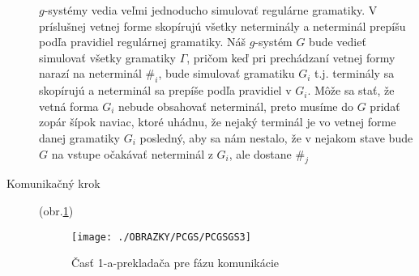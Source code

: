 \begin{dokaz}
\begin{description}
  $g$-systémy vedia veľmi jednoducho simulovať regulárne
  gramatiky. V príslušnej vetnej forme skopírujú všetky
  neterminály a neterminál prepíšu podľa pravidiel regulárnej
  gramatiky. Náš $g$-systém $G$ bude vedieť simulovať všetky gramatiky
  $\Gamma$, pričom keď pri prechádzaní vetnej formy narazí na
  neterminál $\#_i$, bude simulovať gramatiku $G_i$ t.j. terminály
  sa skopírujú a neterminál sa prepíše podľa pravidiel v $G_i$.
  Môže sa stať, že vetná forma $G_i$ nebude obsahovať neterminál,
  preto musíme do $G$ pridať zopár šípok naviac, ktoré uhádnu, že
  nejaký terminál je vo vetnej forme danej gramatiky $G_i$
  posledný, aby sa nám nestalo, že v nejakom stave bude $G$
  na vstupe očakávať neterminál z $G_i$, ale dostane $\#_j$

  \item[Komunikačný krok] (obr.\ref{pcgsgs3})
\begin{figure}[ht]
  \centering
  \texttt{[image: ./OBRAZKY/PCGS/PCGSGS3]}
  \caption{Časť 1-a-prekladača pre fázu komunikácie}\label{pcgsgs3}
\end{figure}


\end{description}
\end{dokaz}

